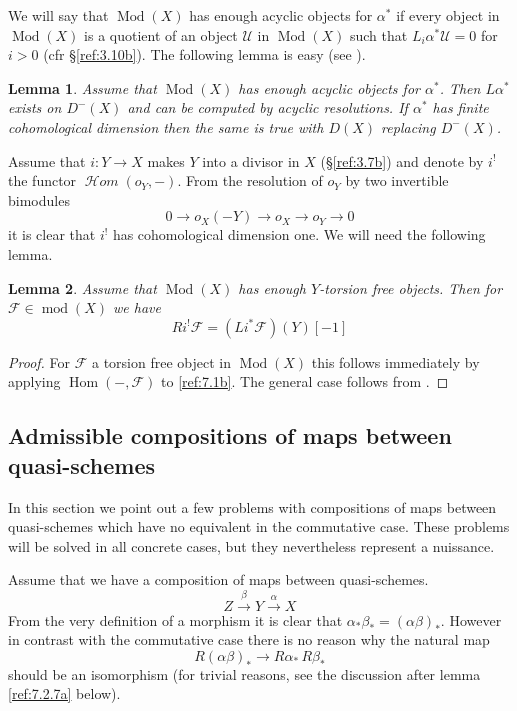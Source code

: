 \documentclass{amsproc}
\def\Fscr{{\mathcal F}}
\def\Hscr{{\mathcal H}}
\def\Uscr{{\mathcal U}}
\def\HHom{\operatorname {\Hscr \mathit{om}}}
\def\Hom{\operatorname {Hom}}
\def\HHom{\operatorname {\Hscr \mathit{om}}}
\def\coh{\operatorname {mod}}
\def\Qch{\operatorname {Mod}}
\def\r{\rightarrow}
\newtheorem{lemmas}{Lemma}[subsection]
\theoremstyle{definition}
\theoremstyle{remark}
\numberwithin{equation}{section}
\numberwithin{table}{section}
\numberwithin{figure}{section}
\begin{document}
We will say that $\Qch(X)$ has enough acyclic objects for
$\alpha^\ast$ if every object in $\Qch(X)$ is a quotient of an object
$\Uscr$ in $\Qch(X)$ such that $L_i\alpha^\ast \Uscr=0$ for $i>0$ (cfr
\S\ref{ref:3.10b}). The following lemma is easy (see \cite{RD}).
\begin{lemmas}
\label{ref:7.1.1a}
Assume that $\Qch(X)$ has enough acyclic objects for
$\alpha^\ast$. Then $L\alpha^\ast$ exists on $D^-(X)$ and can be
computed by acyclic resolutions. If $\alpha^\ast$ has finite
cohomological dimension then the same is true with $D(X)$ replacing $D^-(X)$.
 \end{lemmas}
Assume that $i:Y\r X$ makes $Y$ into a divisor in $X$ (\S\ref{ref:3.7b})
and  denote by $i^!$ the functor $\HHom(o_Y,-)$. 
From the resolution of $o_Y$ by two invertible bimodules
\begin{equation}
\label{ref:7.1b}
0\r o_X(-Y)\r o_X \r o_Y\r 0
\end{equation}
 it is clear that $i^!$ has
cohomological dimension one. We will need the following lemma.
\begin{lemmas}
Assume that $\Qch(X)$ has enough $Y$-torsion free objects. Then for
$\Fscr\in \coh(X)$ we have
\begin{equation}
\label{ref:7.2a}
Ri^!\Fscr=(Li^\ast\Fscr)(Y)[-1]
\end{equation}
\end{lemmas}
\begin{proof} For $\Fscr$ a torsion free object in $\Qch(X)$  this follows
  immediately by 
  applying $\Hom(-,\Fscr)$ to \eqref{ref:7.1b}. The general case follows
  from \cite[Prop. 7.4]{RD}.
\end{proof}

\subsection{Admissible compositions of maps between quasi-schemes}
In this section we point out a few problems with compositions of maps
between quasi-schemes which have no equivalent in the commutative
case. These problems will be solved in all concrete cases, but they
nevertheless represent a nuissance.

Assume that we have a composition of maps between quasi-schemes.
\begin{equation}
\label{ref:7.3a}
Z\xrightarrow{\beta} Y\xrightarrow{\alpha} X
\end{equation}
From the very definition of a morphism it is clear that
$\alpha_\ast\beta_\ast=(\alpha\beta)_\ast$. However in  contrast with
the commutative case there is no reason why the natural map
\begin{equation}
\label{ref:7.4a}
R(\alpha\beta)_\ast\rightarrow R\alpha_\ast\,R\beta_\ast
\end{equation}
should be an isomorphism 
(for trivial reasons, see the discussion after  lemma \ref{ref:7.2.7a} below).
\end{document}
